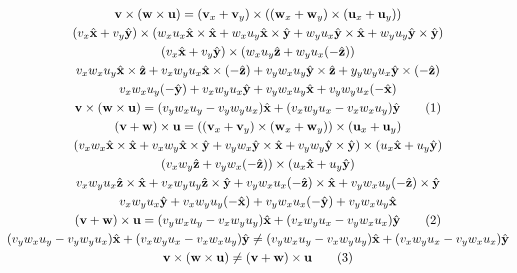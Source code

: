 \documentclass{article}
\newcommand{\vect}[1]{\boldsymbol{\mathbf{#1}}}
\numberwithin{equation}{subsection}
\begin{document}
\begin{gather*}
    \vect{v}\times(\vect{w}\times\vect{u})=(\vect{v}_x+\vect{v}_y)\times((\vect{w}_x+\vect{w}_y)\times(\vect{u}_x+\vect{u}_y))\\
    (v_x\hat{\vect{x}}+v_y\hat{\vect{y}})\times(w_xu_x\hat{\vect{x}}\times\hat{\vect{x}}+w_xu_y\hat{\vect{x}}\times\hat{\vect{y}}+w_yu_x\hat{\vect{y}}\times\hat{\vect{x}}+w_yu_y\hat{\vect{y}}\times\hat{\vect{y}})\\
    (v_x\hat{\vect{x}}+v_y\hat{\vect{y}})\times(w_xu_y\hat{\vect{z}}+w_yu_x(-\hat{\vect{z}}))\\
    v_xw_xu_y\hat{\vect{x}}\times\hat{\vect{z}}+v_xw_yu_x\hat{\vect{x}}\times(-\hat{\vect{z}})+v_yw_xu_y\hat{\vect{y}}\times\hat{\vect{z}}+y_yw_yu_x\hat{\vect{y}}\times(-\hat{\vect{z}})\\
    v_xw_xu_y(-\hat{\vect{y}})+v_xw_yu_x\hat{\vect{y}}+v_yw_xu_y\hat{\vect{x}}+v_yw_yu_x(-\hat{\vect{x}})\\
    \vect{v}\times(\vect{w}\times\vect{u})=(v_yw_xu_y-v_yw_yu_x)\hat{\vect{x}}+(v_xw_yu_x-v_xw_xu_y)\hat{\vect{y}}\tag{\stepcounter{equation}\theequation}\\
    (\vect{v}+\vect{w})\times\vect{u}=((\vect{v}_x+\vect{v}_y)\times(\vect{w}_x+\vect{w}_y))\times(\vect{u}_x+\vect{u}_y)\\
    (v_xw_x\hat{\vect{x}}\times\hat{\vect{x}}+v_xw_y\hat{\vect{x}}\times\hat{\vect{y}}+v_yw_x\hat{\vect{y}}\times\hat{\vect{x}}+v_yw_y\hat{\vect{y}}\times\hat{\vect{y}})\times(u_x\hat{\vect{x}}+u_y\hat{\vect{y}})\\
    (v_xw_y\hat{\vect{z}}+v_yw_x(-\hat{\vect{z}}))\times(u_x\hat{\vect{x}}+u_y\hat{\vect{y}})\\
    v_xw_yu_x\hat{\vect{z}}\times\hat{\vect{x}}+v_xw_yu_y\hat{\vect{z}}\times\hat{\vect{y}}+v_yw_xu_x(-\hat{\vect{z}})\times\hat{\vect{x}}+v_yw_xu_y(-\hat{\vect{z}})\times\hat{\vect{y}}\\
    v_xw_yu_x\hat{\vect{y}}+v_xw_yu_y(-\hat{\vect{x}})+v_yw_xu_x(-\hat{\vect{y}})+v_yw_xu_y\hat{\vect{x}}\\
    (\vect{v}+\vect{w})\times\vect{u}=(v_yw_xu_y-v_xw_yu_y)\hat{\vect{x}}+(v_xw_yu_x-v_yw_xu_x)\hat{\vect{y}}\tag{\stepcounter{equation}\theequation}\\
    (v_yw_xu_y-v_yw_yu_x)\hat{\vect{x}}+(v_xw_yu_x-v_xw_xu_y)\hat{\vect{y}}\neq(v_yw_xu_y-v_xw_yu_y)\hat{\vect{x}}+(v_xw_yu_x-v_yw_xu_x)\hat{\vect{y}}\\
    \vect{v}\times(\vect{w}\times\vect{u})\neq(\vect{v}+\vect{w})\times\vect{u}\tag{\stepcounter{equation}\theequation}
\end{gather*}
\end{document}
